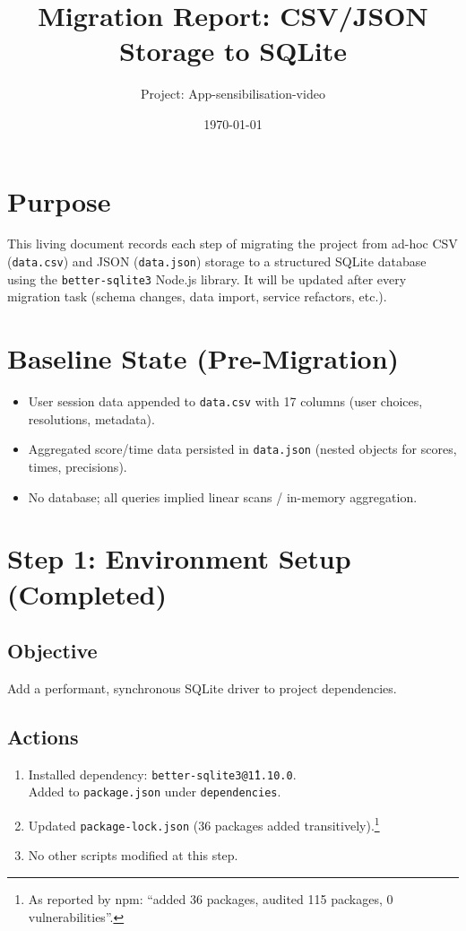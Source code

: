 \documentclass[11pt,a4paper]{article}
\title{Migration Report: CSV/JSON Storage to SQLite}
\author{Project: App-sensibilisation-video}
\date{\today}
\begin{document}
\maketitle
\tableofcontents
\newpage

\section{Purpose}
This living document records each step of migrating the project from ad-hoc CSV (\texttt{data.csv}) and JSON (\texttt{data.json}) storage to a structured SQLite database using the \texttt{better-sqlite3} Node.js library. It will be updated after every migration task (schema changes, data import, service refactors, etc.).

\section{Baseline State (Pre-Migration)}
\begin{itemize}[noitemsep]
  \item User session data appended to \texttt{data.csv} with 17 columns (user choices, resolutions, metadata).
  \item Aggregated score/time data persisted in \texttt{data.json} (nested objects for scores, times, precisions).
  \item No database; all queries implied linear scans / in-memory aggregation.
\end{itemize}

\section{Step 1: Environment Setup (Completed)}
\subsection{Objective}
Add a performant, synchronous SQLite driver to project dependencies.

\subsection{Actions}
\begin{enumerate}[label=1.\arabic*,leftmargin=1.4cm]
  \item Installed dependency: \texttt{better-sqlite3@\^11.10.0}.\\
        Added to \texttt{package.json} under \texttt{dependencies}.
  \item Updated \texttt{package-lock.json} (36 packages added transitively).\footnote{As reported by npm: ``added 36 packages, audited 115 packages, 0 vulnerabilities''.}
  \item No other scripts modified at this step.
\end{enumerate}
\end{document}
